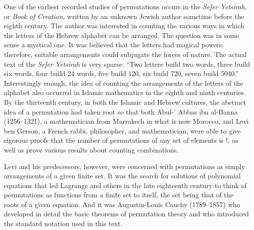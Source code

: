 \documentclass[11pt,oneside]{article}
\begin{document}
\begin{BookBody}
\noindent One of the earliest recorded studies of permutations occurs in the\textit{ Sefer Yetsirah,} or \textit{Book of Creation,} written by an unknown Jewish author sometime before the eighth century. The author was interested in counting the various ways in which the letters of the Hebrew alphabet can be arranged. The question was in some sense a mystical one. It was believed that the letters had magical powers; therefore, suitable arrangements could subjugate the forces of nature. The actual text of the \textit{Sefer Yetsirah} is very sparse: “Two letters build two words, three build six words, four build 24 words, five build 120, six build 720, seven build 5040.” Interestingly enough, the idea of counting the arrangements of the letters of the alphabet also occurred in Islamic mathematics in the eighth and ninth centuries. By the thirteenth century, in both the Islamic and Hebrew cultures, the abstract idea of a permutation had taken root so that both Abul-’ Abbas ibn al-Banna (1256–1321), a mathematician from Marrakech in what is now Morocco, and Levi ben Gerson, a French rabbi, philosopher, and mathematician, were able to give rigorous proofs that the number of permutations of any set of  elements is !, as well as prove various results about counting combinations.

Levi and his predecessors, however, were concerned with permutations as simply arrangements of a given finite set. It was the search for solutions of polynomial equations that led Lagrange and others in the late eighteenth century to think of permutations as functions from a finite set to itself, the set being that of the roots of a given equation. And it was Augustin-Louis Cauchy (1789–1857) who developed in detail the basic theorems of permutation theory and who introduced the standard notation used in this text.

\end{BookBody}

\BookNarrativetrue
\end{document}
